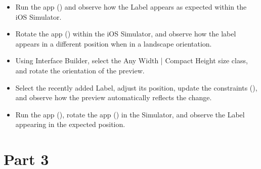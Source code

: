 \documentclass[a4paper,11pt]{scrartcl}
\begin{document}
\begin{itemize}
\item Run the app () and observe how the Label appears as expected within the iOS Simulator.
\item Rotate the app (\keys{\cmd+\arrowkeyright}) within the iOS Simulator, and observe how the label appears in a different position when in a landscape orientation.
\item Using Interface Builder, select the Any Width | Compact Height size class, and rotate the orientation of the preview.
\item Select the recently added Label, adjust its position, update the constraints (\keys{\shift+\cmd+=}), and observe how the preview automatically reflects the change.
\item Run the app (), rotate the app (\keys{\cmd+\arrowkeyright}) in the Simulator, and observe the Label appearing in the expected position.
\end{itemize}

\section*{Part 3}
\end{document}

